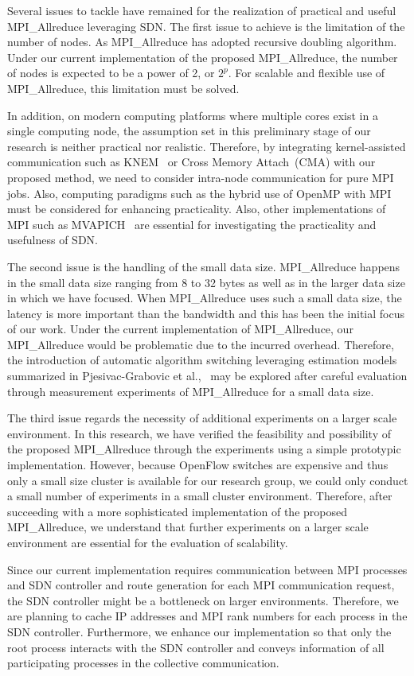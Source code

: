 Several issues to tackle have remained for the realization of practical
and useful MPI\_Allreduce leveraging SDN\@. The first issue to
achieve is the limitation of the number of nodes. As
MPI\_Allreduce has adopted recursive doubling algorithm. Under
our current implementation of the proposed MPI\_Allreduce, the
number of nodes is expected to be a power of 2, or \(2^p\). For scalable
and flexible use of MPI\_Allreduce, this limitation must be
solved.

In addition, on modern computing platforms where multiple cores exist in
a single computing node, the assumption set in this preliminary stage of
our research is neither practical nor realistic. Therefore, by
integrating kernel-assisted communication such as KNEM~\autocite{Goglin2013}
or Cross Memory Attach~(CMA) with our proposed method, we need to consider
intra-node communication for pure MPI jobs. Also, computing paradigms
such as the hybrid use of OpenMP with MPI must be considered for
enhancing practicality. Also, other implementations of MPI such as
MVAPICH~\autocite{mvapich} are essential for investigating the practicality
and usefulness of SDN\@.

The second issue is the handling of the small data size.
MPI\_Allreduce happens in the small data size ranging from 8 to
32 bytes as well as in the larger data size in which we have focused.
When MPI\_Allreduce uses such a small data size, the latency is
more important than the bandwidth and this has been the initial focus of
our work. Under the current implementation of MPI\_Allreduce,
our MPI\_Allreduce would be problematic due to the incurred
overhead. Therefore, the introduction of automatic algorithm switching
leveraging estimation models summarized in Pjesivac-Grabovic et
al.,~\autocite{PjesivacGrbovic} may be explored after careful evaluation through
measurement experiments of MPI\_Allreduce for a small data size.

The third issue regards the necessity of additional experiments on a
larger scale environment. In this research, we have verified the
feasibility and possibility of the proposed MPI\_Allreduce
through the experiments using a simple prototypic implementation.
However, because OpenFlow switches are expensive and thus only a small
size cluster is available for our research group, we could only conduct
a small number of experiments in a small cluster environment. Therefore,
after succeeding with a more sophisticated implementation of the
proposed MPI\_Allreduce, we understand that further experiments
on a larger scale environment are essential for the evaluation of
scalability.

Since our current implementation requires communication between MPI
processes and SDN controller and route generation for each MPI
communication request, the SDN controller might be a bottleneck on
larger environments. Therefore, we are planning to cache IP addresses
and MPI rank numbers for each process in the SDN controller.
Furthermore, we enhance our implementation so that only the root process
interacts with the SDN controller and conveys information of all
participating processes in the collective communication.
